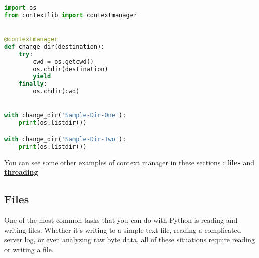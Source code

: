 \documentclass[a4paper, 12pt, titlepage]{scrartcl} %
\begin{document}
\begin{lstlisting}[language=Python]
import os
from contextlib import contextmanager


@contextmanager
def change_dir(destination):
    try:
        cwd = os.getcwd()
        os.chdir(destination)
        yield
    finally:
        os.chdir(cwd)


with change_dir('Sample-Dir-One'):
    print(os.listdir())

with change_dir('Sample-Dir-Two'):
    print(os.listdir())
\end{lstlisting} \vspace{5mm}

You can see some other examples of context manager in these sections : \hyperref[subsec:Files]{\textbf{files}} and \hyperref[subsec:Threading]{\textbf{threading}}

\subsection{Files}
One of the most common tasks that you can do with Python is reading and writing files. Whether it’s writing to a simple text file, reading a complicated server log, or even analyzing raw byte data, all of these situations require reading or writing a file.

\vspace{5mm}
\end{document}
